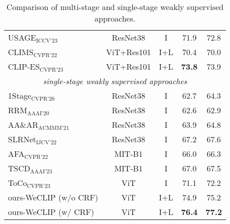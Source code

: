 \begin{table}[ht]
\begin{tabular}{l c c c c}
USAGE$_{\text{ICCV'23}}$~\cite{35} & ResNet38 & I & 71.9 & 72.8 \\
CLIMS$_{\text{CVPR'22}}$~\cite{51} & ViT+Res101 & I+L & 70.4 & 70.0 \\
CLIP-ES$_{\text{CVPR'23}}$~\cite{29} & ViT+Res101 & I+L & \textbf{73.8} & 73.9 \\
\hline
\multicolumn{5}{c}{\textit{single-stage weakly supervised approaches}} \\
1Stage$_{\text{CVPR'20}}$~\cite{3} & ResNet38 & I & 62.7 & 64.3 \\
RRM$_{\text{AAAI'20}}$~\cite{55} & ResNet38 & I & 62.6 & 62.9 \\
AA\&AR$_{\text{ACMMM'21}}$~\cite{61} & ResNet38 & I & 63.9 & 64.8 \\
SLRNet$_{\text{IJCV'22}}$~\cite{34} & ResNet38 & I & 67.2 & 67.6 \\
AFA$_{\text{CVPR'22}}$~\cite{39} & MIT-B1 & I & 66.0 & 66.3 \\
TSCD$_{\text{AAAI'23}}$~\cite{53} & MIT-B1 & I & 67.0 & 67.5 \\
ToCo$_{\text{CVPR'23}}$~\cite{40} & ViT & I & 71.1 & 72.2 \\
\hline
ours-WeCLIP (w/o CRF) & ViT & I+L & 74.9 & 75.2 \\
ours-WeCLIP (w/ CRF)  & ViT & I+L & \textbf{76.4} & \textbf{77.2} \\
\hline
\end{tabular}
\caption{Comparison of multi-stage and single-stage weakly supervised approaches.}
\end{table}
